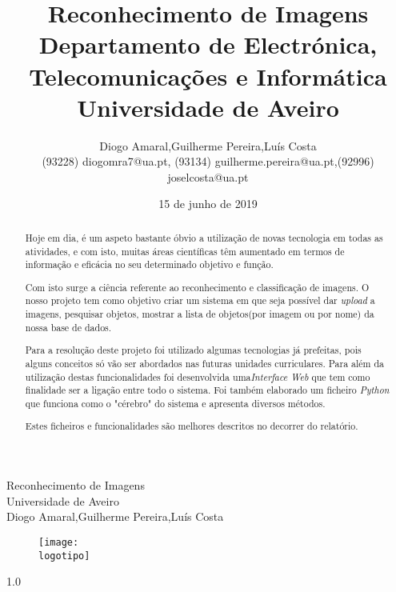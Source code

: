 \documentclass{report}
\begin{document}
%
\def\titulo{Reconhecimento de Imagens}
\def\data{15 de junho de 2019}
\def\autores{Diogo Amaral,Guilherme Pereira,Luís Costa}
\def\autorescontactos{(93228) diogomra7@ua.pt, (93134) guilherme.pereira@ua.pt,(92996) joselcosta@ua.pt}
\def\versao{1.0}
\def\departamento{Departamento de Electrónica, Telecomunicações e Informática}
\def\empresa{Universidade de Aveiro}
\def\logotipo{ua.pdf}
%
%
\begin{titlepage}

\begin{center}
%
\vspace*{50mm}
%
{\Huge \titulo}\\ 
%
\vspace{10mm}
%
{\Large \empresa}\\
%
\vspace{10mm}
%
{\LARGE \autores}\\ 
%
\vspace{30mm}
%
\begin{figure}[h]
\center
\texttt{[image: \\logotipo]}
\end{figure}
%
\vspace{30mm}
\end{center}
%
\begin{flushright}
\versao
\end{flushright}
\end{titlepage}

\title{%
{\Huge\textbf{\titulo}}\\
{\Large \departamento\\ \empresa}
}
%
\author{%
    \autores \\
    \autorescontactos
}
%
\date{\data}
%
\maketitle


\begin{abstract}
Hoje em dia, é um aspeto bastante óbvio a utilização de novas tecnologia em todas as atividades, e com isto, muitas áreas científicas têm aumentado em termos de informação e eficácia no seu determinado objetivo e função.
 
Com isto surge a ciência referente ao reconhecimento e classificação de imagens. O nosso projeto tem como objetivo criar um sistema em que seja possível dar \textit{upload} a imagens, pesquisar objetos, mostrar a lista de objetos(por imagem ou por nome) da nossa base de dados.

Para a resolução deste projeto foi utilizado algumas tecnologias já prefeitas, pois alguns conceitos só vão ser abordados nas futuras unidades curriculares. Para além da utilização destas funcionalidades foi desenvolvida uma\textit{Interface Web} que tem como finalidade ser a ligação entre todo o sistema. Foi também elaborado um ficheiro \textit{Python} que funciona como o "cérebro"  do sistema e apresenta diversos métodos.

Estes ficheiros e funcionalidades são melhores descritos no decorrer do relatório.
\end{abstract}
\end{document}
